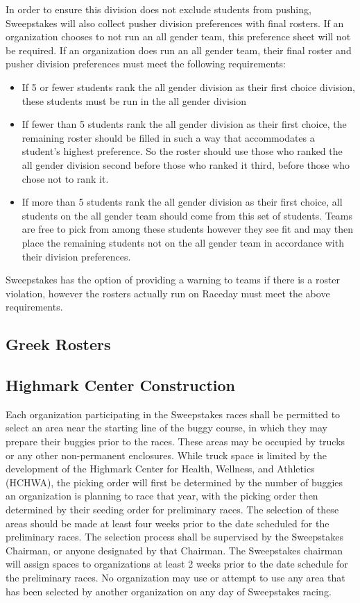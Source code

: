 In order to ensure this division does not exclude students from pushing, Sweepstakes will also collect pusher division preferences with final rosters. If an organization chooses to not run an all gender team, this preference sheet will not be required. If an organization does run an all gender team, their final roster and pusher division preferences must meet the following requirements: 
\begin{itemize}
    \item If 5 or fewer students rank the all gender division as their first choice division, these students must be run in the all gender division 
    \item If fewer than 5 students rank the all gender division as their first choice, the remaining roster should be filled in such a way that accommodates a student's highest preference. So the roster should use those who ranked the all gender division second before those who ranked it third, before those who chose not to rank it. 
    \item If more than 5 students rank the all gender division as their first choice, all students on the all gender team should come from this set of students. Teams are free to pick from among these students however they see fit and may then place the remaining students not on the all gender team in accordance with their division preferences. 
\end{itemize}


Sweepstakes has the option of providing a warning to teams if there is a roster violation, however the rosters actually run on Raceday must meet the above requirements. 

\subsection*{Greek Rosters}

\subsection*{Highmark Center Construction} \label{Seeding Area}
Each organization participating in the Sweepstakes races shall be permitted to select an area near the starting line of the buggy course, in which they may prepare their buggies prior to the races. These areas may be occupied by trucks or any other non-permanent enclosures. While truck space is limited by the development of the Highmark Center for Health, Wellness, and Athletics (HCHWA), the picking order will first be determined by the number of buggies an organization is planning to race that year, with the picking order then determined by their seeding order for preliminary races. The selection of these areas should be made at least four weeks prior to the date scheduled for the preliminary races. The selection process shall be supervised by the Sweepstakes Chairman, or anyone designated by that Chairman. The Sweepstakes chairman will assign spaces to organizations at least 2 weeks prior to the date schedule for the preliminary races. No organization may use or attempt to use any area that has been selected by another organization on any day of Sweepstakes racing.

